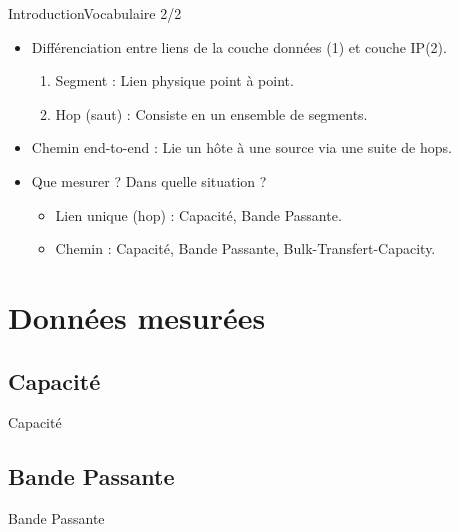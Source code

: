 \documentclass[compress]{beamer}
\begin{document}
\begin{frame}{Introduction}{Vocabulaire 2/2}
\begin{itemize}
	\item Différenciation entre liens de la couche données (1) et couche IP(2).
	\begin{enumerate}
		\item Segment : Lien physique point à point. %
		\item Hop (saut) : Consiste en un ensemble de segments. %
	\end{enumerate}
	\item Chemin end-to-end : Lie un hôte à une source via une suite de hops.
	\item Que mesurer ? Dans quelle situation ? 
	\begin{itemize}
		\item Lien unique (hop) : Capacité, Bande Passante.
		\item Chemin : Capacité, Bande Passante, Bulk-Transfert-Capacity.
	\end{itemize}
\end{itemize}
\end{frame}



\section{Données mesurées}
\subsection{Capacité}
\begin{frame}{Capacité}

\end{frame}
\subsection{Bande Passante}
\begin{frame}{Bande Passante}

\end{frame}
\end{document}
